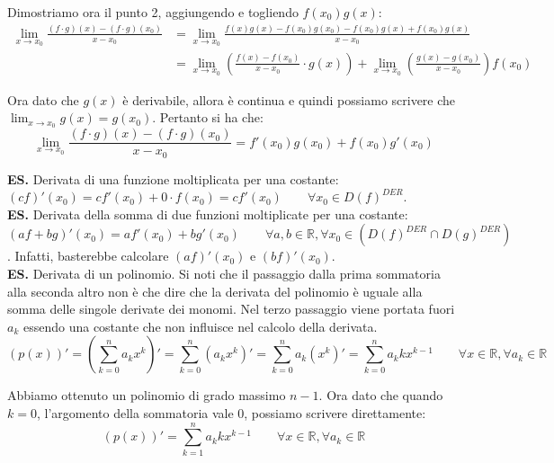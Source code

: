 \documentclass{article}
\begin{document}
\noindent Dimostriamo ora il punto 2, aggiungendo e togliendo $f(x_0)g(x)$:
\begin{align*}
    \lim_{x \to x_0} \frac{(f \cdot g)(x) - (f \cdot g)(x_0)}{x - x_0} &= \lim_{x \to x_0} \frac{f(x)g(x) - f(x_0)g(x_0) - f(x_0)g(x) + f(x_0)g(x)}{x - x_0}\\
    &= \lim_{x \to x_0} \left(\frac{f(x) - f(x_0)}{x - x_0} \cdot g(x)\right) + \lim_{x \to x_0} \left(\frac{g(x) - g(x_0)}{x - x_0}\right) f(x_0)
\end{align*}

\noindent Ora dato che $g(x)$ è derivabile, allora è continua e quindi possiamo scrivere che $\lim_{x \to x_0} g(x) = g(x_0)$. Pertanto si ha che:
\begin{equation*}
    \lim_{x \to x_0} \frac{(f \cdot g)(x) - (f \cdot g)(x_0)}{x - x_0} = f'(x_0)g(x_0) + f(x_0)g'(x_0)
\end{equation*}

\noindent\textbf{ES.} Derivata di una funzione moltiplicata per una costante: $(cf)'(x_0) = cf'(x_0) + 0 \cdot f(x_0) = cf'(x_0) \qquad \forall x_0 \in D(f)^{DER}$.\\

\noindent\textbf{ES.} Derivata della somma di due funzioni moltiplicate per una costante: $(af + bg)'(x_0) = af'(x_0) + bg'(x_0) \qquad \forall a, b \in \mathbb{R}, \forall x_0 \in (D(f)^{DER} \cap D(g)^{DER})$. Infatti, basterebbe calcolare $(af)'(x_0)$ e $(bf)'(x_0)$.\\

\noindent\textbf{ES.} Derivata di un polinomio. Si noti che il passaggio dalla prima sommatoria alla seconda altro non è che dire che la derivata del polinomio è uguale alla somma delle singole derivate dei monomi. Nel terzo passaggio viene portata fuori $a_k$ essendo una costante che non influisce nel calcolo della derivata.
\begin{equation*}
    (p(x))' = \left(\sum_{k = 0}^n a_k x^k\right)' = \sum_{k = 0}^n(a_kx^k)' = \sum_{k = 0}^n a_k(x^k)' = \sum_{k = 0}^n a_k k x^{k - 1} \qquad \forall x \in \mathbb{R}, \forall a_k \in \mathbb{R}
\end{equation*}

\noindent Abbiamo ottenuto un polinomio di grado massimo $n - 1$. Ora dato che quando $k = 0$, l'argomento della sommatoria vale $0$, possiamo scrivere direttamente:
\begin{equation*}
    (p(x))' = \sum_{k =1}^n a_k k x^{k - 1} \qquad \forall x \in \mathbb{R}, \forall a_k \in \mathbb{R}
\end{equation*}
\end{document}
